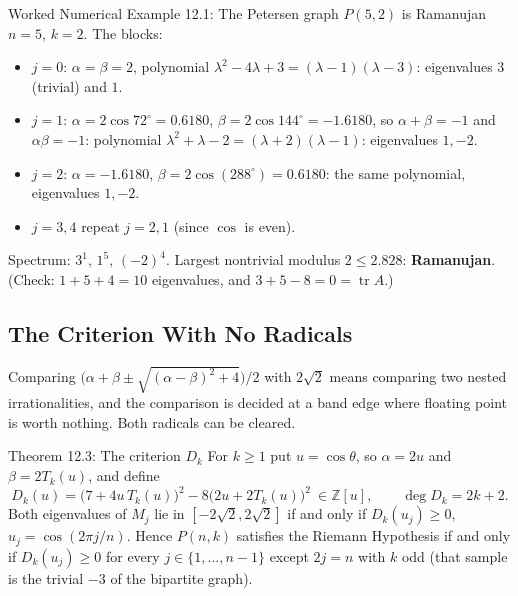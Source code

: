 \documentclass[11pt]{article}
\begin{document}
\begin{callbox}{Worked Numerical Example 12.1: The Petersen graph $P(5,2)$ is Ramanujan}
$n=5$, $k=2$. The blocks:
\begin{itemize}[leftmargin=*,nosep]
  \item $j=0$: $\alpha=\beta=2$, polynomial $\lambda^2-4\lambda+3=(\lambda-1)(\lambda-3)$: eigenvalues $3$ (trivial) and $1$.
  \item $j=1$: $\alpha=2\cos72^\circ=0.6180$, $\beta=2\cos144^\circ=-1.6180$, so $\alpha+\beta=-1$ and $\alpha\beta=-1$: polynomial $\lambda^2+\lambda-2=(\lambda+2)(\lambda-1)$: eigenvalues $1,-2$.
  \item $j=2$: $\alpha=-1.6180$, $\beta=2\cos(288^\circ)=0.6180$: the same polynomial, eigenvalues $1,-2$.
  \item $j=3,4$ repeat $j=2,1$ (since $\cos$ is even).
\end{itemize}
Spectrum: $3^{1},\,1^{5},\,(-2)^{4}$. Largest nontrivial modulus $2\le2.828$: \textbf{Ramanujan}. (Check: $1+5+4=10$ eigenvalues, and $3+5-8=0=\operatorname{tr}A$.)
\end{callbox}

\subsection{The Criterion With No Radicals}

Comparing $\bigl(\alpha+\beta\pm\sqrt{(\alpha-\beta)^2+4}\bigr)/2$ with $2\sqrt2$ means comparing two nested irrationalities, and the comparison is decided at a band edge where floating point is worth nothing. Both radicals can be cleared.

\begin{thmbox}{Theorem 12.3: The criterion $D_k$}
For $k\ge1$ put $u=\cos\theta$, so $\alpha=2u$ and $\beta=2T_k(u)$, and define
\begin{equation}
  D_k(u)=\bigl(7+4u\,T_k(u)\bigr)^2-8\bigl(2u+2T_k(u)\bigr)^2\ \in\mathbb Z[u],\qquad \deg D_k=2k+2 .
\end{equation}
Both eigenvalues of $M_j$ lie in $[-2\sqrt2,2\sqrt2]$ if and only if $D_k(u_j)\ge0$, $u_j=\cos(2\pi j/n)$. Hence $P(n,k)$ satisfies the Riemann Hypothesis if and only if $D_k(u_j)\ge0$ for every $j\in\{1,\dots,n-1\}$ except $2j=n$ with $k$ odd (that sample is the trivial $-3$ of the bipartite graph).
\end{thmbox}
\end{document}
